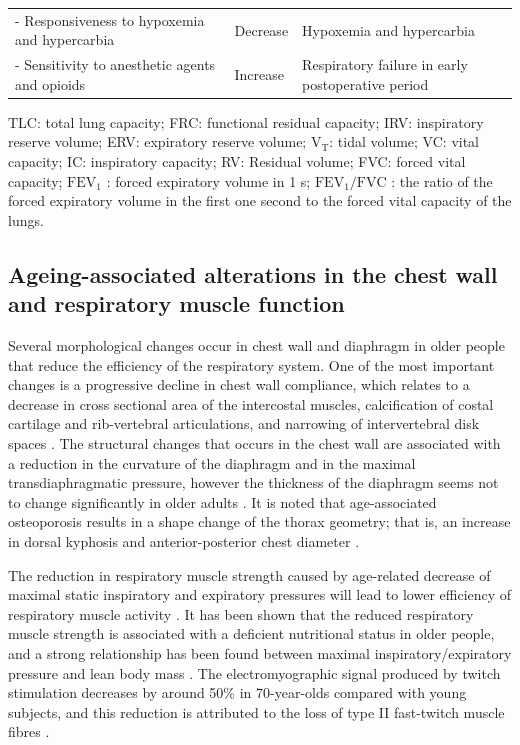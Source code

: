 \begin{table}[htbp]
\begin{tabular}{p{5.8cm} p{3.6cm} p{4.8cm}}
- Responsiveness to hypoxemia and hypercarbia & Decrease & Hypoxemia and hypercarbia\\
- Sensitivity to anesthetic agents and opioids & Increase & Respiratory failure in early postoperative period\\
\hline
\end{tabular}
\begin{tablenotes}
        \footnotesize
        \item{TLC: total lung capacity; FRC: functional residual capacity; IRV: inspiratory reserve volume; ERV: expiratory reserve volume; $\mathrm{V_T}$: tidal volume; VC: vital capacity; IC: inspiratory capacity; RV: Residual volume; FVC: forced vital capacity; $\mathrm{FEV_1}$ : forced expiratory volume in 1 s; $\mathrm{FEV_1/FVC}$ : the ratio of the forced expiratory volume in the first one second to the forced vital capacity of the lungs.}
\end{tablenotes}
\end{table}

\subsection{Ageing-associated alterations in the chest wall and respiratory muscle function} \label{ChestWallChange}
Several morphological changes occur in chest wall and diaphragm in older people that reduce the efficiency of the respiratory system. One of the most important changes is a progressive decline in chest wall compliance, which relates to a decrease in cross sectional area of the intercostal muscles, calcification of costal cartilage and rib-vertebral articulations, and narrowing of intervertebral disk spaces \citep{murray1986normal, crapo1993aging}. The structural changes that occurs in the chest wall are associated with a reduction in the curvature of the diaphragm and in the maximal transdiaphragmatic pressure, however the thickness of the diaphragm seems not to change significantly in older adults \citep{zaugg2000respiratory, sprung2006age}. It is noted that age-associated osteoporosis results in a shape change of the thorax geometry; that is, an increase in dorsal kyphosis and anterior-posterior chest diameter \citep{janssens1999physiological,sprung2006age}. 

The reduction in respiratory muscle strength caused by age-related decrease of maximal static inspiratory and expiratory pressures will lead to lower efficiency of respiratory muscle activity \citep{wijesinghe2005effect,sprung2006age,lalley2013aging}. It has been shown that the reduced respiratory muscle strength is associated with a deficient nutritional status in older people, and a strong relationship has been found between maximal inspiratory/expiratory pressure and lean body mass \citep{arora1982respiratory,janssens1999physiological}. The electromyographic signal produced by twitch stimulation decreases by around 50\% in 70-year-olds compared with young subjects, and this reduction is attributed to the loss of type II fast-twitch muscle fibres \citep{larsson1983histochemical}. 

